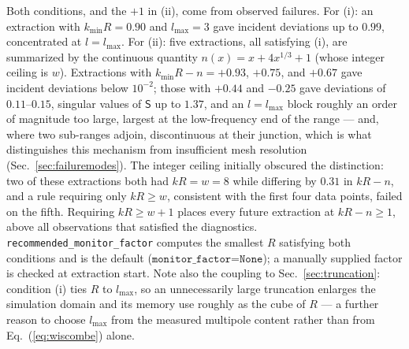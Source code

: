 \documentclass[11pt]{article}
\begin{document}
Both conditions, and the $+1$ in (ii), come from observed failures.
For (i): an extraction with $k_{\min}R = 0.90$ and $l_{\max}=3$ gave
incident deviations up to $0.99$, concentrated at $l = l_{\max}$.  For
(ii): five extractions, all satisfying (i), are summarized by the
continuous quantity $n(x) = x + 4x^{1/3} + 1$ (whose integer ceiling is
$w$).  Extractions with $k_{\min}R - n = +0.93$, $+0.75$, and $+0.67$
gave incident deviations below $10^{-2}$; those with $+0.44$ and
$-0.25$ gave deviations of $0.11$--$0.15$, singular values of
$\mathsf{S}$ up to $1.37$, and an $l=l_{\max}$ block roughly an order
of magnitude too large, largest at the low-frequency end of the range
--- and, where two sub-ranges adjoin, discontinuous at their
junction, which is what distinguishes this mechanism from insufficient
mesh resolution (Sec.~\ref{sec:failuremodes}).  The integer ceiling
initially obscured the distinction: two of these extractions both had
$kR = w = 8$ while differing by $0.31$ in $kR - n$, and a rule
requiring only $kR \ge w$, consistent with the first four data points,
failed on the fifth.  Requiring $kR \ge w + 1$ places every future
extraction at $kR - n \ge 1$, above all observations that satisfied the
diagnostics.  \texttt{recommended\_monitor\_factor} computes the
smallest $R$ satisfying both conditions and is the default
($\texttt{monitor\_factor=None}$); a manually supplied factor is
checked at extraction start.  Note also the coupling to
Sec.~\ref{sec:truncation}: condition (i) ties $R$ to $l_{\max}$, so an
unnecessarily large truncation enlarges the simulation domain and its
memory use roughly as the cube of $R$ --- a further reason to choose
$l_{\max}$ from the measured multipole content rather than from
Eq.~(\ref{eq:wiscombe}) alone.
\end{document}
